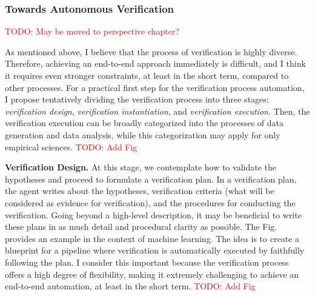\documentclass{book}
\begin{document}




\subsubsection{Towards Autonomous Verification}
\textcolor{red}{TODO: May be moved to perspective chapter?}

As mentioned above, I believe that the process of verification is highly diverse. Therefore, achieving an end-to-end approach immediately is difficult, and I think it requires even stronger constraints, at least in the short term, compared to other processes. For a practical first step for the verification process automation, I propose tentatively dividing the verification process into three stages: \textit{verification design}, \textit{verification instantiation}, and \textit{verification execution}. Then, the verification execution can be broadly categorized into the processes of data generation and data analysis, while this categorization may apply for only empirical sciences. \textcolor{red}{TODO: Add Fig}

\textbf{Verification Design.} At this stage, we contemplate how to validate the hypotheses and proceed to formulate a verification plan. In a verification plan, the agent writes about the hypotheses, verification criteria (what will be considered as evidence for verification), and the procedures for conducting the verification. Going beyond a high-level description, it may be beneficial to write these plans in as much detail and procedural clarity as possible. The Fig. provides an example in the context of machine learning. The idea is to create a blueprint for a pipeline where verification is automatically executed by faithfully following the plan. I consider this important because the verification process offers a high degree of flexibility, making it extremely challenging to achieve an end-to-end automation, at least in the short term. \textcolor{red}{TODO: Add Fig}
\end{document}
